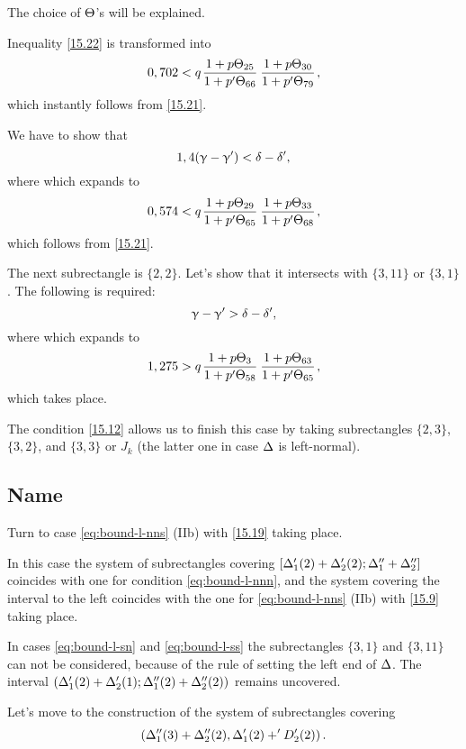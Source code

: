 The choice of $\Theta$'s will be explained.

Inequality \ref{15.22} is transformed into
\begin{equation*}
	0,702 < q \up{25}{66} \up{30}{79},
\end{equation*}
which instantly follows from \ref{15.21}.

We have to show that
\begin{equation}\label{15.24}
	1,4 (\upgamma - \upgamma') < \delta - \delta',
\end{equation}
where
which expands to
\begin{equation*}
	0,574 < q \up{29}{65} \up{33}{68},
\end{equation*}
which follows from \ref{15.21}.

The next subrectangle is $\{2, 2\}$.
Let's show that it intersects with $\{3, 11\}$ or $\{3, 1\}$.
The following is required:
\begin{equation}\label{15.25}
	\upgamma - \upgamma' > \delta - \delta',
\end{equation}
where
which expands to
\begin{equation*}
	1,275 > q \up{3}{58} \up{63}{65},
\end{equation*}
which takes place.

The condition \ref{15.12} allows us to finish this case
by taking subrectangles $\{2, 3\}$, $\{3, 2\}$, and $\{3, 3\}$ or $J_k$
(the latter one in case $\Delta$ is left-normal).

\subsection{Name}

Turn to case \ref{eq:bound-l-nns} (IIb) with \ref{15.19} taking place.

In this case the system of subrectangles covering $\left[\Delta_1'(2) + \Delta_2'(2); \Delta_1'' + \Delta_2''\right]$
coincides with one for condition \ref{eq:bound-l-nnn},
and the system covering the interval to the left
coincides with the one for \ref{eq:bound-l-nns} (IIb) with \ref{15.9} taking place.

In cases \ref{eq:bound-l-sn} and \ref{eq:bound-l-ss}
the subrectangles $\{3, 1\}$ and $\{3, 11\}$
can not be considered, because of the rule of setting the left end of $\Delta$.
The interval $\left(\Delta_1'(2) + \Delta_2'(1); \Delta_1''(2) + \Delta_2''(2)\right)$ remains uncovered.

Let's move to the construction of the system of subrectangles covering
\begin{equation}\label{15.26}
	\left(\Delta_1''(3) + \Delta_2''(2), \Delta_1'(2) + 'D_2'(2)\right).
\end{equation}

